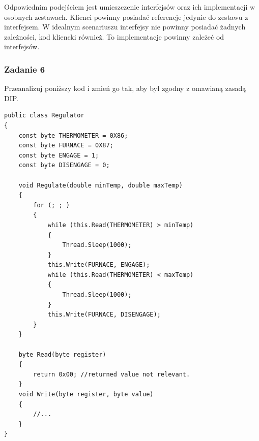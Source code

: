 
Odpowiednim podejściem jest umieszczenie interfejsów oraz ich implementacji w osobnych zestawach. Klienci %
powinny posiadać referencje jedynie do zestawu z interfejsem. W idealnym scenariuszu interfejsy nie powinny posiadać żadnych zależności, kod kliencki również. To implementacje powinny zależeć od interfejsów. 
\subsubsection{Zadanie 6}
Przeanalizuj poniższy kod i zmień go tak, aby był zgodny z omawianą zasadą DIP.
\begin{lstlisting}
public class Regulator
{
	const byte THERMOMETER = 0X86;
	const byte FURNACE = 0X87;
	const byte ENGAGE = 1;
	const byte DISENGAGE = 0;
	
	void Regulate(double minTemp, double maxTemp)
	{
		for (; ; )
		{
			while (this.Read(THERMOMETER) > minTemp)
			{
				Thread.Sleep(1000);
			}
			this.Write(FURNACE, ENGAGE);
			while (this.Read(THERMOMETER) < maxTemp)
			{
				Thread.Sleep(1000);
			}
			this.Write(FURNACE, DISENGAGE);
		}
	}
	
	byte Read(byte register)
	{
		return 0x00; //returned value not relevant.
	}
	void Write(byte register, byte value)
	{
		//...
	}
}
\end{lstlisting}

